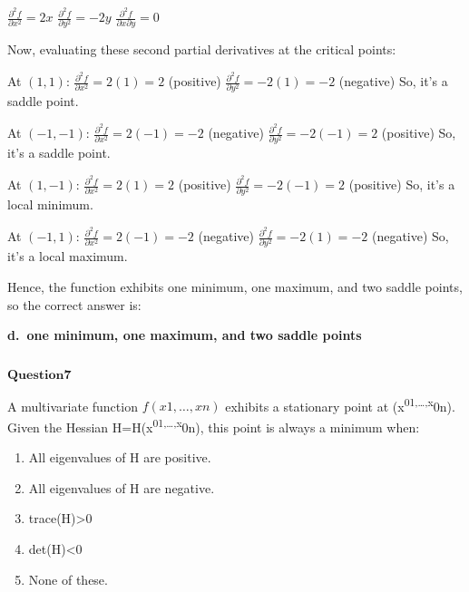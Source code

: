 \documentclass[11pt]{article}
\makeatletter
\newcommand{\boxspacing}{\kern\kvtcb@left@rule\kern\kvtcb@boxsep}
\newcommand{\prompt}[4]{
        {\ttfamily\llap{{\color{#2}[#3]:\hspace{3pt}#4}}\vspace{-\baselineskip}}
    }
\makeatother
\begin{document}
$ \frac{\partial^2 f}{\partial x^2} = 2x $ $
\frac{\partial^2 f}{\partial y^2} = -2y $ $
\frac{\partial^2 f}{\partial x \partial y} = 0 $

Now, evaluating these second partial derivatives at the critical points:

At $ (1, 1) $: $ \frac{\partial^2 f}{\partial x^2} = 2(1) = 2 $
(positive) $ \frac{\partial^2 f}{\partial y^2} = -2(1) = -2 $
(negative) So, it's a saddle point.

At $ (-1, -1) $: $ \frac{\partial^2 f}{\partial x^2} = 2(-1) = -2 $
(negative) $ \frac{\partial^2 f}{\partial y^2} = -2(-1) = 2 $
(positive) So, it's a saddle point.

At $ (1, -1) $: $ \frac{\partial^2 f}{\partial x^2} = 2(1) = 2 $
(positive) $ \frac{\partial^2 f}{\partial y^2} = -2(-1) = 2 $
(positive) So, it's a local minimum.

At $ (-1, 1) $: $ \frac{\partial^2 f}{\partial x^2} = 2(-1) = -2 $
(negative) $ \frac{\partial^2 f}{\partial y^2} = -2(1) = -2 $
(negative) So, it's a local maximum.

Hence, the function exhibits one minimum, one maximum, and two saddle
points, so the correct answer is:

\textbf{d.~one minimum, one maximum, and two saddle points}

    \begin{tcolorbox}[breakable, size=fbox, boxrule=1pt, pad at break*=1mm,colback=cellbackground, colframe=cellborder]
\prompt{In}{incolor}{ }{\boxspacing}
\begin{Verbatim}[commandchars=\\\{\}]

\end{Verbatim}
\end{tcolorbox}

    $\textbf{Question7}$

A multivariate function $f(x1,…,xn)$ exhibits a stationary point at
(x\textsuperscript{01,\ldots,x}0n). Given the Hessian
H=H(x\textsuperscript{01,\ldots,x}0n), this point is always a minimum
when:

\begin{enumerate}
\def\labelenumi{\alph{enumi}.}
\item
  All eigenvalues of H are positive.
\item
  All eigenvalues of H are negative.
\item
  trace(H)\textgreater0
\item
  det(H)\textless0
\item
  None of these.
\end{enumerate}
\end{document}

